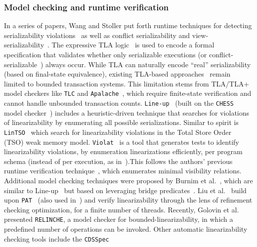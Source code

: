\subsubsection{Model checking and runtime verification}

In a series of papers, Wang and Stoller put forth runtime techniques for 
detecting serializability violations~\cite{WaSt06a} as well as conflict serializability and view-serializability~\cite{WaSt06b}. 
%
The expressive TLA logic~\cite{La94} is used to encode a 
formal specification that validates whether only serializable executions (or 
conflict-serializable~\cite{CoOlPnTuZu07}) always occur. 
While TLA can naturally encode ``real'' serializability (based on final-state 
equivalence), existing TLA-based approaches~\cite{SoVaVi20, Ho24} remain 
limited to bounded transaction systems. This limitation stems from TLA/TLA+ 
model checkers like \texttt{TLC} and \texttt{Apalache}~\cite{YuMaLa99, 
KoKuTr19}, which require 
finite-state verification and cannot handle unbounded transaction counts.
%
\texttt{Line-up}~\cite{BuDeMuTa10} (built on the \texttt{CHESS} model 
checker~\cite{MuQaBaBaNaNe08}) includes a heuristic-driven technique that 
searches for violations of linearizability by enumerating all possible 
serializations. Similar to spirit is \texttt{LinTSO}~\cite{BuGoMuYa12} which 
search for 
linearizability violations in the Total Store
Order (TSO) weak memory model.
%
\texttt{Violat}~\cite{EmEn19} is a tool that generates tests to identify 
linearizability violations, by 
enumeration linearizations efficiently, per program schema (instead of per 
execution, as in~\cite{BuDeMuTa10}).This follows the authors' previous runtime verification technique~\cite{EmEn18}, which enumerates minimal visibility relations.
%
Additional model checking techniques were proposed by Burnim et 
al.~\cite{BuNeSe11}, which are similar to Line-up~\cite{BuDeMuTa10} but based 
on leveraging bridge predicates~\cite{BuSe09}. 
%
Liu et al.~\cite{LiChLiSuZhDo12} build upon \texttt{PAT}~\cite{SuLuDoPa09} 
(also used 
in~\cite{LiChLiSu09, Zh11}) and verify linearizability through the lens of 
refinement checking optimization, for a finite number of threads.
%
%
Recently, Golovin et al.~\cite{GoKoVa25} presented \texttt{RELINCHE}, a model 
checker for bounded-linearizability, in which a predefined number of operations 
can be invoked.
%
Other automatic linearizability checking tools include the \texttt{CDSSpec} 
